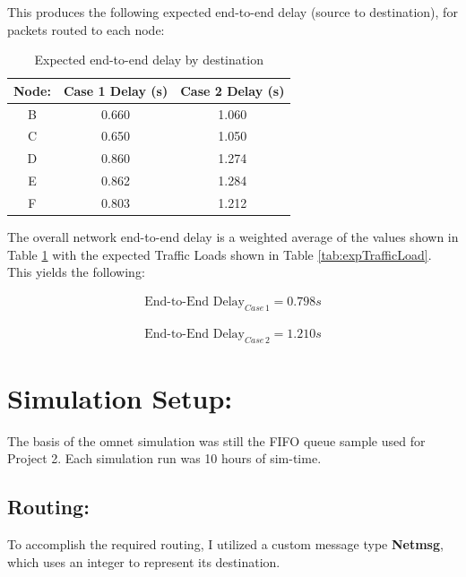 \documentclass{article}
\begin{document}
This produces the following expected end-to-end delay (source to destination), for packets routed to each node:

\begin{table}[h!]
\centering
\begin{tabular}{|c|c|c|} \hline
\textbf{Node:} & \textbf{Case 1 Delay (s)} & \textbf{Case 2 Delay (s)} \\ \hline
B & 0.660 & 1.060 \\ \hline
C & 0.650 & 1.050 \\ \hline
D & 0.860 & 1.274 \\ \hline
E & 0.862 & 1.284 \\ \hline
F & 0.803 & 1.212 \\ \hline
\end{tabular}
\caption{Expected end-to-end delay by destination}
\label{tab:expEndDelay}
\end{table}

The overall network end-to-end delay is a weighted average of the values shown in Table \ref{tab:expEndDelay} with the expected Traffic Loads shown in Table \ref{tab:expTrafficLoad}.
This yields the following:
\newline

\begin{minipage}{0.5\textwidth}
\begin{align*}
\text{End-to-End Delay}_{Case \, 1} = 0.798s
\end{align*}
\end{minipage}
\begin{minipage}{0.5\textwidth}
\begin{align*}
\text{End-to-End Delay}_{Case \, 2} = 1.210s
\end{align*}
\end{minipage}
\newline 

\section{Simulation Setup:}
\label{sec:SimSetup}

The basis of the omnet simulation was still the FIFO queue sample used for Project 2.
Each simulation run was 10 hours of sim-time.

\subsection{Routing:}
\label{subsec:RoutingSetup}
To accomplish the required routing, I utilized a custom message type \textbf{Netmsg}, which uses an integer to represent its destination.
\end{document}
